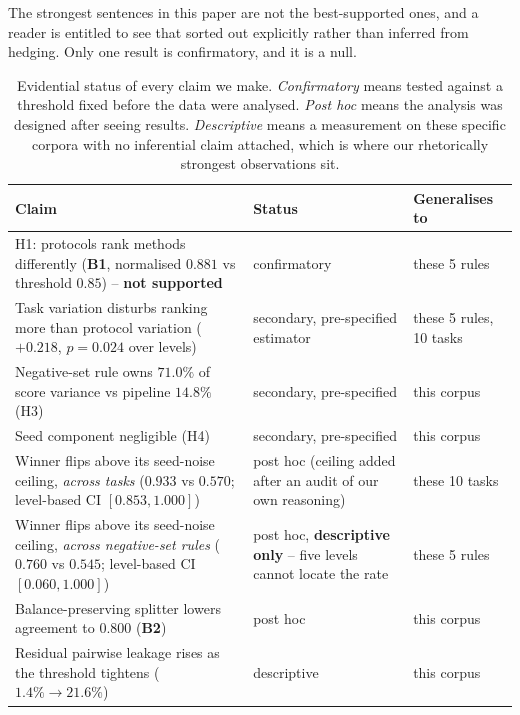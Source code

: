 \documentclass[11pt,a4paper]{article}
\begin{document}
The strongest sentences in this paper are not the best-supported ones, and a reader is
entitled to see that sorted out explicitly rather than inferred from hedging. Only one
result is confirmatory, and it is a null.

\begin{table}[htbp]\centering\small
\caption{Evidential status of every claim we make. \emph{Confirmatory} means tested against
a threshold fixed before the data were analysed. \emph{Post hoc} means the analysis was
designed after seeing results. \emph{Descriptive} means a measurement on these specific
corpora with no inferential claim attached, which is where our rhetorically strongest
observations sit.}
\label{tab:status}
\footnotesize
\begin{tabular}{>{\raggedright\arraybackslash}p{}%
                >{\raggedright\arraybackslash}p{}%
                >{\raggedright\arraybackslash}p{}}
\toprule
Claim & Status & Generalises to \\
\midrule
H1: protocols rank methods differently (\textbf{B1}, normalised $0.881$ vs threshold
  $0.85$) -- \textbf{not supported} & confirmatory & these 5 rules \\
\addlinespace
Task variation disturbs ranking more than protocol variation
  (${+}0.218$, $p = 0.024$ over levels) & secondary, pre-specified estimator
  & these 5 rules, 10 tasks \\
\addlinespace
Negative-set rule owns $71.0\%$ of score variance vs pipeline $14.8\%$ (H3)
  & secondary, pre-specified & this corpus \\
Seed component negligible (H4) & secondary, pre-specified & this corpus \\
\addlinespace
Winner flips above its seed-noise ceiling, \emph{across tasks} ($0.933$ vs $0.570$;
  level-based CI $[0.853, 1.000]$) & post hoc (ceiling added after an audit of our own
  reasoning) & these 10 tasks \\
Winner flips above its seed-noise ceiling, \emph{across negative-set rules} ($0.760$ vs
  $0.545$; level-based CI $[0.060, 1.000]$) & post hoc, \textbf{descriptive only} -- five
  levels cannot locate the rate & these 5 rules \\
Balance-preserving splitter lowers agreement to $0.800$ (\textbf{B2})
  & post hoc & this corpus \\
\addlinespace
Residual pairwise leakage rises as the threshold tightens ($1.4\% \to 21.6\%$)
  & descriptive & this corpus \\

\end{tabular}
\end{table}
\end{document}

